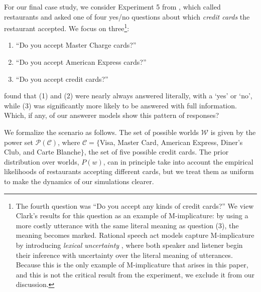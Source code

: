 \documentclass[12pt, floatsintext, jou]{apa6}
\begin{document}
For our final case study, we consider Experiment 5 from , which called restaurants and asked one of four yes/no questions about which \emph{credit cards} the restaurant accepted. We focus on three\footnote{
The fourth question was ``Do you accept any kinds of credit cards?'' We view Clark's results for this question as an example of M-implicature: by using a more costly utterance with the same literal meaning as question (3), the meaning becomes marked. Rational speech act models capture M-implicature by introducing \emph{lexical uncertainty} \cite{BergenGoodmanLevy12_Alternatives}, where both speaker and listener begin their inference with uncertainty over the literal meaning of utterances. %
Because this is the only example of M-implicature that arises in this paper, and this is not the critical result from the experiment, we exclude it from our discussion.%
}:
\begin{enumerate}
\item ``Do you accept Master Charge cards?'' 
\item ``Do you accept American Express cards?''
\item ``Do you accept credit cards?'' 
\end{enumerate}
 found that (1) and (2) were nearly always answered literally, with a `yes' or `no', while (3) was significantly more likely to be answered with full information. Which, if any, of our answerer models show this pattern of responses? %

We formalize the scenario as follows. The set of possible worlds $\mathcal{W}$ is given by the power set $\mathcal{P}(\mathcal{C})$, where $\mathcal{C} = \{$Visa, Master Card, American Express, Diner's Club, and Carte Blanche$\}$, the set of five possible credit cards. %
The prior distribution over worlds, $P(w)$, can in principle take into account the empirical likelihoods of restaurants accepting different cards, but we treat them as uniform to make the dynamics of our simulations clearer. %
\end{document}
